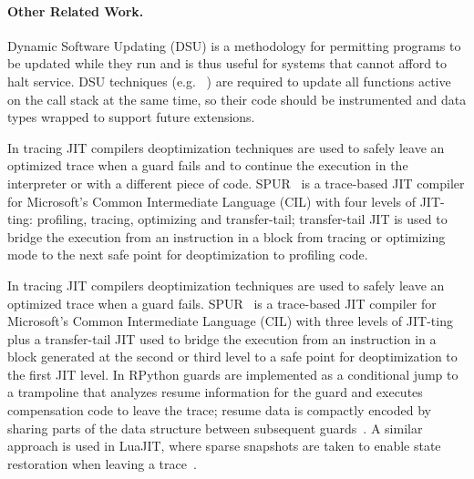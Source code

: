 \paragraph{Other Related Work.}
\ifdefined \fullver
Dynamic Software Updating (DSU) is a methodology for permitting programs to be updated while they run and is thus useful for systems that cannot afford to halt service. DSU techniques (e.g. ~\cite{neamtiu2006dsu,makris2009dsu}) are required to update all functions active on the call stack at the same time, so their code should be instrumented and data types wrapped to support future extensions.

In tracing JIT compilers deoptimization techniques are used to safely leave an optimized trace when a guard fails and to continue the execution in the interpreter or with a different piece of code. SPUR~\cite{bebenita2010spur} is a trace-based JIT compiler for Microsoft's Common Intermediate Language (CIL) with four levels of JIT-ting: profiling, tracing, optimizing and transfer-tail; transfer-tail JIT is used to bridge the execution from an instruction in a block from tracing or optimizing mode to the next safe point for deoptimization to profiling code. 
\else

In tracing JIT compilers deoptimization techniques are used to safely leave an optimized trace when a guard fails. SPUR~\cite{bebenita2010spur} is a trace-based JIT compiler for Microsoft's Common Intermediate Language (CIL) with three levels of JIT-ting plus a transfer-tail JIT used to bridge the execution from an instruction in a block generated at the second or third level to a safe point for deoptimization to the first JIT level. 
\fi
In RPython guards are implemented as a conditional jump to a trampoline that analyzes resume information for the guard and executes compensation code to leave the trace; resume data is compactly encoded by sharing parts of the data structure between subsequent guards~\cite{schneider2012rpython}. A similar approach is used in LuaJIT, where sparse snapshots are taken to enable state restoration when leaving a trace~\cite{luajit}.


